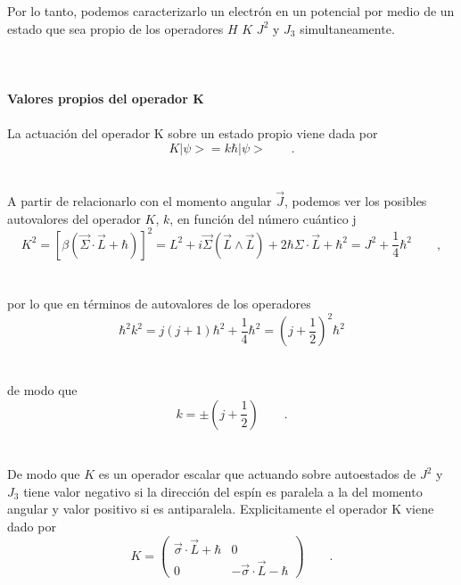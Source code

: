 \documentclass[11pt,letterpaper]{article}     %
\begin{document}
Por lo tanto, podemos caracterizarlo un electrón en un potencial por medio de un estado que sea propio de los operadores $H$ $K$ $J^2$ y $J_3$ simultaneamente. \\ \\ \\ \\
\textbf{Valores propios del operador K} \\ \\
La actuación del operador K sobre un estado propio viene dada por
\begin{equation} \label{eq:83}
K |\psi> = k \hbar |\psi> \qquad .
\end{equation} \\ \\
A partir de relacionarlo con el momento angular $\vec{J}$, podemos ver los posibles autovalores del operador $K$, $k$, en función del número cuántico j
\begin{equation} \label{eq:84}
K^2 = [\beta(\vec{\Sigma}\cdot \vec{L} + \hbar)]^2 = L^2 + i\vec{\Sigma}(\vec{L} \wedge \vec{L}) + 2\hbar \Sigma \cdot \vec{L} + \hbar^2=J^2+ \frac{1}{4} \hbar^2 \qquad,
\end{equation} \\ \\
por lo que en términos de autovalores de los operadores
\begin{equation} \label{eq:85}
\hbar^2 k^2 = j(j+1)\hbar^2 + \frac{1}{4}\hbar^2=(j+\frac{1}{2})^2 \hbar^2
\end{equation} \\ \\
de modo que
\begin{equation} \label{eq:86}
k= \pm(j + \frac{1}{2}) \qquad .
\end{equation} \\ \\
De modo que $K$ es un operador escalar que actuando sobre autoestados de $J^2$ y $J_3$ tiene valor negativo si la dirección del espín es paralela a la del momento angular y valor positivo si es antiparalela. Explicitamente el operador K viene dado por
\begin{equation} \label{eq:87}
K= \begin{pmatrix}
\vec{\sigma} \cdot \vec{L} + \hbar & 0 \\ 0 & - \vec{\sigma} \cdot \vec{L} - \hbar
\end{pmatrix} \qquad . 
\end{equation} \\ \\
\end{document}
